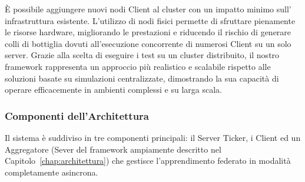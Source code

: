 \documentclass[a4paper, oneside, openright]{report}
\begin{document}
È possibile aggiungere nuovi nodi Client al cluster con un impatto minimo sull’ infrastruttura esistente.
L’utilizzo di nodi fisici permette di sfruttare pienamente le risorse hardware, migliorando le prestazioni e riducendo il rischio di generare colli di bottiglia dovuti all'esecuzione concorrente di numerosi Client su un solo server.
Grazie alla scelta di eseguire i test su un cluster distribuito, il nostro framework rappresenta un approccio più realistico e scalabile rispetto alle soluzioni basate su simulazioni centralizzate, dimostrando la sua capacità di operare efficacemente in ambienti complessi e su larga scala.

\subsubsection*{Componenti dell’Architettura}
Il sistema è suddiviso in tre componenti principali: il Server Ticker, i Client ed un Aggregatore (Sever del framework ampiamente descritto nel Capitolo~\ref{chap:architettura}) che gestisce l’apprendimento federato in modalità completamente asincrona.
\end{document}
